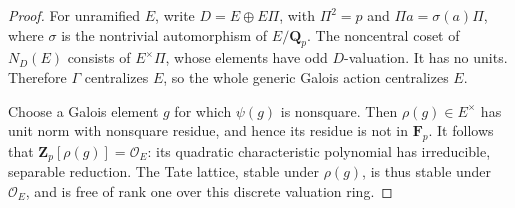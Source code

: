 \begin{proof}
For unramified $E$, write
$D=E\oplus E\Pi$, with $\Pi^2=p$ and
$\Pi a=\sigma(a)\Pi$, where $\sigma$ is the nontrivial
automorphism of $E/\mathbf Q_p$. The noncentral coset of $N_D(E)$ consists
of $E^\times\Pi$, whose elements have odd $D$-valuation.
It has no units. Therefore $\Gamma$ centralizes $E$,
so the whole generic Galois action centralizes $E$.

Choose a Galois element $g$ for which $\psi(g)$ is nonsquare.
Then $\rho(g)\in E^\times$ has unit norm with nonsquare
residue, and hence its residue is not in $\mathbf F_p$.
It follows that $\mathbf Z_p[\rho(g)]=\mathcal O_E$:
its quadratic characteristic polynomial has irreducible,
separable reduction. The Tate lattice, stable under $\rho(g)$,
is thus stable under $\mathcal O_E$, and is free of rank one
over this discrete valuation ring.
\end{proof}

